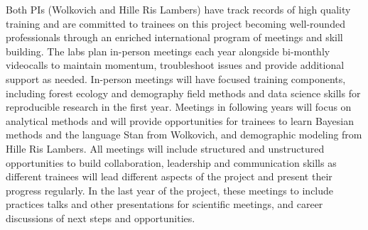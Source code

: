 \documentclass[12pt,oneside]{article}
\begin{document}
Both PIs (Wolkovich and Hille Ris Lambers) have track records of high quality training and are committed to trainees on this project becoming well-rounded professionals through an enriched international program of meetings and skill building. The labs plan in-person meetings each year  alongside bi-monthly videocalls to maintain momentum, troubleshoot issues and provide additional support as needed. In-person meetings will have focused training components, including forest ecology and demography field methods and data science skills for reproducible research in the first year. Meetings in following years will focus on analytical methods and will provide  opportunities for trainees to learn Bayesian methods and the language Stan from Wolkovich, and demographic modeling from Hille Ris Lambers. All meetings will include structured and unstructured opportunities to build collaboration, leadership and communication skills as different trainees will lead different aspects of the project and present their progress regularly. In the last year of the project, these meetings to include practices talks and other presentations for scientific meetings, and career discussions of next steps and opportunities.  %
\end{document}
